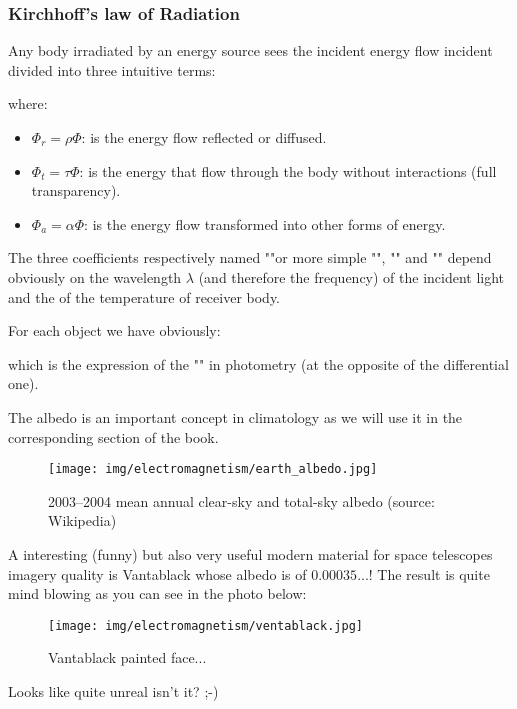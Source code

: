 	
	\pagebreak
	\subsubsection{Kirchhoff's law of Radiation}
	Any body irradiated by an energy source sees the incident energy flow incident divided into three intuitive terms:
	
	where:
	\begin{itemize}
		\item $\Phi_r=\rho\Phi$: is the energy flow reflected or diffused.

		\item $\Phi_t=\tau\Phi$: is the energy that flow through the body without interactions (full transparency).

		\item $\Phi_a=\alpha\Phi$: is the energy flow transformed into other forms of energy.
	\end{itemize}
	The three coefficients respectively named ""or more simple "", "" and "" depend obviously on the wavelength $\lambda$ (and therefore the frequency) of the incident light and the of the temperature of receiver body.
	
	For each object we have obviously:
	
	which is the expression of the "" in photometry (at the opposite of the differential one).
	
	The albedo is an important concept in climatology as we will use it in the corresponding section of the book.
	\begin{figure}[H]
		\centering
		\texttt{[image: img/electromagnetism/earth\_albedo.jpg]}
		\caption{2003–2004 mean annual clear-sky and total-sky albedo (source: Wikipedia)}
	\end{figure}
	
	\pagebreak
	A interesting (funny) but also very useful modern material for space telescopes imagery quality is Vantablack whose albedo is of  $0.00035$...! The result is quite mind blowing as you can see in the photo below:
	\begin{figure}[H]
		\centering
		\texttt{[image: img/electromagnetism/ventablack.jpg]}
		\caption{Vantablack painted face...}
	\end{figure}
	Looks like quite unreal isn't it? ;-)
	
